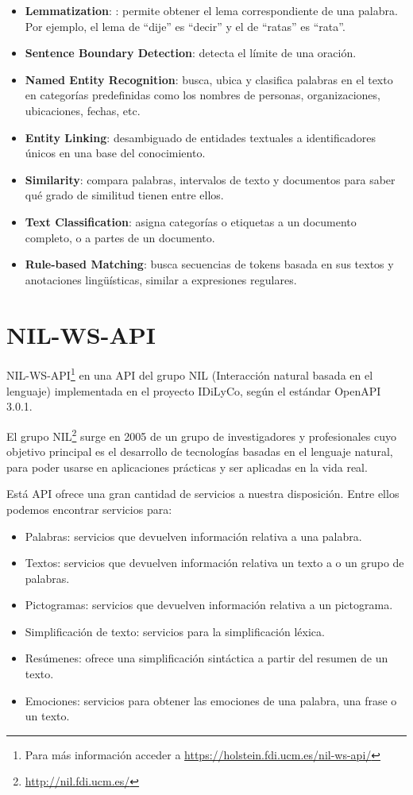 \begin{itemize}
	

	\item \textbf{Lemmatization}: : permite obtener el lema correspondiente de una
	palabra. Por ejemplo, el lema de ``dije'' es ``decir'' y el de ``ratas'' es ``rata''.
	\item \textbf{Sentence Boundary Detection}: detecta el límite de una oración.
	\item \textbf{Named Entity Recognition}: busca, ubica y clasifica palabras en el texto en categorías predefinidas como los nombres de personas, organizaciones, ubicaciones, fechas, etc. 
	\item \textbf{Entity Linking}: desambiguado de entidades textuales a identificadores únicos en una base del conocimiento.
	\item \textbf{Similarity}: compara palabras, intervalos de texto y documentos para saber qué grado de similitud tienen entre ellos.
	\item \textbf{Text Classification}: asigna categorías o etiquetas a un documento completo, o a partes de un documento.
	\item \textbf{Rule-based Matching}: busca secuencias de tokens basada en sus textos y anotaciones lingüísticas, similar a expresiones regulares.

\end{itemize}

\section{NIL-WS-API}\label{sec:nilws}

NIL-WS-API\footnote{Para más información acceder a \href{https://holstein.fdi.ucm.es/nil-ws-api/}{https://holstein.fdi.ucm.es/nil-ws-api/}} en una API del grupo NIL (Interacción natural basada en el lenguaje) implementada en el proyecto IDiLyCo, según el estándar OpenAPI 3.0.1. 

El grupo NIL\footnote{\href{http://nil.fdi.ucm.es/}{http://nil.fdi.ucm.es/}} surge en 2005 de un grupo de investigadores y profesionales cuyo objetivo principal es el desarrollo de tecnologías basadas en el lenguaje natural, para poder usarse en aplicaciones prácticas y ser aplicadas en la vida real. 

Está API ofrece una gran cantidad de servicios a nuestra disposición. Entre ellos podemos encontrar servicios para:


\begin{itemize}
	\item Palabras: servicios que devuelven información relativa a una palabra.
	\item Textos: servicios que devuelven información relativa  un texto a o un grupo de palabras.
	\item Pictogramas: servicios que devuelven información relativa a un pictograma.
	\item Simplificación de texto: servicios para la simplificación léxica.
	\item Resúmenes: ofrece una simplificación sintáctica a partir del resumen de un texto.
	\item Emociones: servicios para obtener las emociones de una palabra, una frase o un texto. 
\end{itemize}

